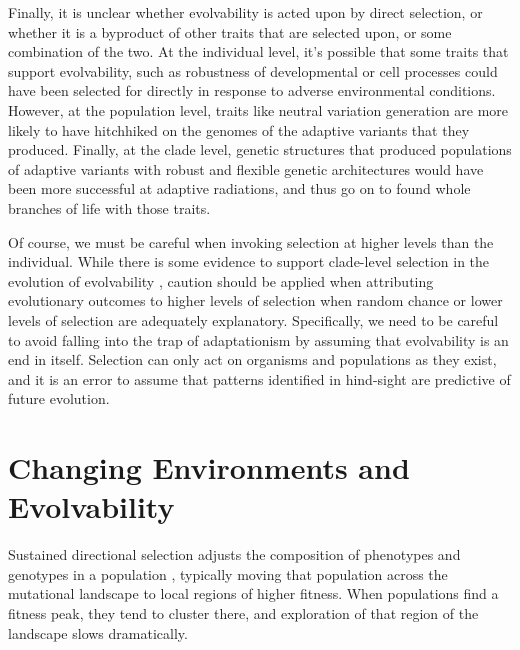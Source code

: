 \documentclass[PhD]{msu-thesis}
\begin{document}
Finally, it is unclear whether evolvability is acted upon by direct selection, or whether it is a byproduct of other traits that are selected upon, or some combination of the two. At the individual level, it’s possible that some traits that support evolvability, such as robustness of developmental or cell processes\cite{kirschner_evolvability_1998} could have been selected for directly in response to adverse environmental conditions. However, at the population level, traits like neutral variation generation are more likely to have hitchhiked on the genomes of the adaptive variants that they produced. Finally, at the clade level, genetic structures that produced populations of adaptive variants with robust and flexible genetic architectures would have been more successful at adaptive radiations\cite{dawkins_13_2003}, and thus go on to found whole branches of life with those traits\cite{kirschner_evolvability_1998}. 

Of course, we must be careful when invoking selection at higher levels than the individual. While there is some evidence to support clade-level selection in the evolution of evolvability \cite{okasha_evolution_2006}, caution should be applied when attributing evolutionary outcomes to higher levels of selection when random chance or lower levels of selection are adequately explanatory. Specifically, we need to be careful to avoid falling into the trap of adaptationism\cite{gould_spandrels_1979} by assuming that evolvability is an end in itself. Selection can only act on organisms and populations as they exist, and it is an error to assume that patterns identified in hind-sight are predictive of future evolution.


\section{Changing Environments and Evolvability}
Sustained directional selection adjusts the composition of phenotypes and genotypes in a population \cite{wright_evolution_1931}, typically moving that population across the mutational landscape to local regions of higher fitness. When populations find a fitness peak, they tend to cluster there, and exploration of that region of the landscape slows dramatically.
\end{document}
